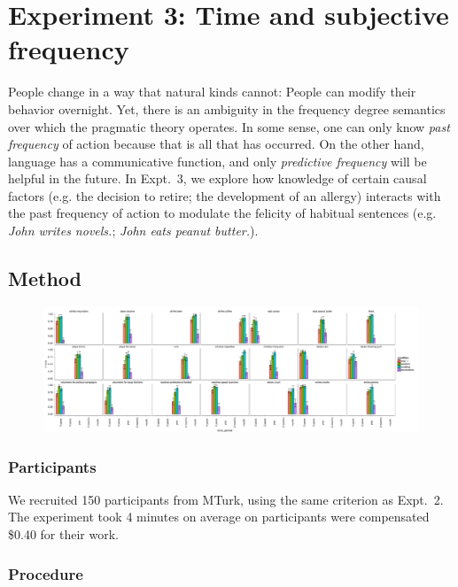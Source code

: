 \documentclass[10pt,letterpaper]{article}
\begin{document}
\section{Experiment 3: Time and subjective frequency}

People change in a way that natural kinds cannot: People can modify their behavior overnight.
Yet, there is an ambiguity in the frequency degree semantics over which the pragmatic theory operates.
In some sense, one can only know \emph{past frequency} of action because that is all that has occurred.
On the other hand, language has a communicative function, and only \emph{predictive frequency} will be helpful in the future.
In Expt.~3, we explore how knowledge of certain causal factors (e.g. the decision to retire; the development of an allergy) interacts with the past frequency of action to modulate the felicity of habitual sentences (e.g. \emph{John writes novels.}; \emph{John eats peanut butter.}).

\subsection{Method}
\begin{figure}[t]
\centering
  \includegraphics[width=\textwidth]{truth-judgments-3items-withtj2.pdf}
  \caption{}
  \label{fig:tj3}
\end{figure}

\subsubsection{Participants} 

We recruited 150 participants from MTurk, using the same criterion as Expt.~2.
The experiment took 4 minutes on average on participants were compensated \$0.40 for their work.

\subsubsection{Procedure}
\end{document}
